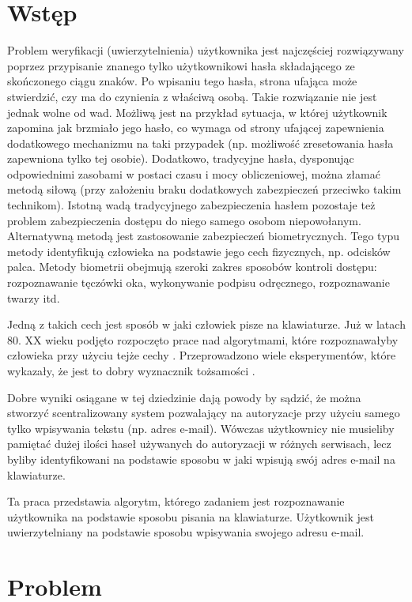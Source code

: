 \chapter{Wstęp}
Problem weryfikacji (uwierzytelnienia) użytkownika jest najczęściej rozwiązywany poprzez przypisanie znanego tylko użytkownikowi hasła składającego ze skończonego ciągu znaków. Po wpisaniu tego hasła, strona ufająca może stwierdzić, czy ma do czynienia z właściwą osobą. Takie rozwiązanie nie jest jednak wolne od wad. Możliwą jest na przykład sytuacja, w której użytkownik zapomina jak brzmiało jego hasło, co wymaga od strony ufającej zapewnienia dodatkowego mechanizmu na taki przypadek (np. możliwość zresetowania hasła zapewniona tylko tej osobie). Dodatkowo, tradycyjne hasła, dysponując odpowiednimi zasobami w postaci czasu i mocy obliczeniowej, można złamać metodą siłową (przy założeniu braku dodatkowych zabezpieczeń przeciwko takim technikom). Istotną wadą tradycyjnego zabezpieczenia hasłem pozostaje też problem zabezpieczenia dostępu do niego samego osobom niepowołanym.
Alternatywną metodą jest zastosowanie zabezpieczeń biometrycznych. Tego typu metody identyfikują człowieka na podstawie jego cech fizycznych, np. odcisków palca. Metody biometrii obejmują szeroki zakres sposobów kontroli dostępu: rozpoznawanie tęczówki oka, wykonywanie podpisu odręcznego, rozpoznawanie twarzy itd. \cite{BIOMETRICS}

Jedną z takich cech jest sposób w jaki człowiek pisze na klawiaturze. Już w latach 80. XX wieku podjęto rozpoczęto prace nad algorytmami, które rozpoznawałyby człowieka przy użyciu tejże cechy \cite{KD_1}. Przeprowadzono wiele eksperymentów, które wykazały, że jest to dobry wyznacznik tożsamości \cite{KD_1, KD_2, KD_3, KD_4}.

Dobre wyniki osiągane w tej dziedzinie dają powody by sądzić, że można stworzyć scentralizowany system pozwalający na autoryzacje przy użyciu samego tylko wpisywania tekstu (np. adres e-mail). Wówczas użytkownicy nie musieliby pamiętać dużej ilości haseł używanych do autoryzacji w różnych serwisach, lecz byliby identyfikowani na podstawie sposobu w jaki wpisują swój adres e-mail na klawiaturze.

Ta praca przedstawia algorytm, którego zadaniem jest rozpoznawanie użytkownika na podstawie sposobu pisania na klawiaturze. Użytkownik jest uwierzytelniany na podstawie sposobu wpisywania swojego adresu e-mail.

\chapter{Problem}
